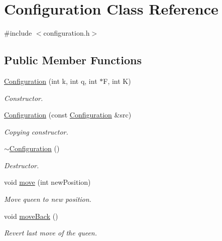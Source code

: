 \hypertarget{class_configuration}{
\section{Configuration Class Reference}
\label{class_configuration}
}


{\ttfamily \#include $<$configuration.h$>$}

\subsection*{Public Member Functions}
\begin{DoxyCompactItemize}
\item 
\hyperlink{class_configuration_a341c35d408954b68b37a533df2953b9a}{Configuration} (int k, int q, int $\ast$F, int K)
\begin{DoxyCompactList}\small\item\em Constructor. \item\end{DoxyCompactList}\item 
\hyperlink{class_configuration_a8fb945e5f8e16521556b7d440f1fa69a}{Configuration} (const \hyperlink{class_configuration}{Configuration} \&src)
\begin{DoxyCompactList}\small\item\em Copying constructor. \item\end{DoxyCompactList}\item 
\hyperlink{class_configuration_a0dd0fa189e239f4c9a036303f641441e}{$\sim$Configuration} ()
\begin{DoxyCompactList}\small\item\em Destructor. \item\end{DoxyCompactList}\item 
void \hyperlink{class_configuration_a376c3c8652d090d37e833edbd8062401}{move} (int newPosition)
\begin{DoxyCompactList}\small\item\em Move queen to new position. \item\end{DoxyCompactList}\item 
void \hyperlink{class_configuration_a0ea8b5ce3341e601c8dcc8af0d0b066f}{moveBack} ()
\begin{DoxyCompactList}\small\item\em Revert last move of the queen. \item\end{DoxyCompactList}\item 

\end{DoxyCompactItemize}
